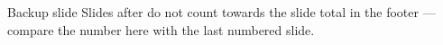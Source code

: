 \begin{frame}{Backup slide}
  Slides after  do not count towards the slide
  total in the footer --- compare the number here with the last numbered
  slide.
\end{frame}
